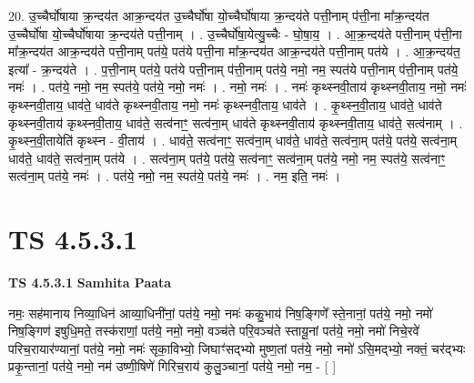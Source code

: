 \documentclass[17pt]{extarticle}
\begin{document}
20. उ॒च्चैर्घो॑षाया क्र॒न्दय॑त आक्र॒न्दय॑त उ॒च्चैर्घो॑षा यो॒च्चैर्घो॑षाया क्र॒न्दय॑ते पत्ती॒नाम् प॑त्ती॒ना मा᳚क्र॒न्दय॑त उ॒च्चैर्घो॑षा यो॒च्चैर्घो॑षाया क्र॒न्दय॑ते पत्ती॒नाम् । . उ॒च्चैर्घो॑षा॒येत्यु॒च्चैः - घो॒षा॒य॒ । . आ॒क्र॒न्दय॑ते पत्ती॒नाम् प॑त्ती॒ना मा᳚क्र॒न्दय॑त आक्र॒न्दय॑ते पत्ती॒नाम् पत॑ये॒ पत॑ये पत्ती॒ना मा᳚क्र॒न्दय॑त आक्र॒न्दय॑ते पत्ती॒नाम् पत॑ये । . आ॒क्र॒न्दय॑त॒ इत्या᳚ - क्र॒न्दय॑ते । . प॒त्ती॒नाम् पत॑ये॒ पत॑ये पत्ती॒नाम् प॑त्ती॒नाम् पत॑ये॒ नमो॒ नम॒ स्पत॑ये पत्ती॒नाम् प॑त्ती॒नाम् पत॑ये॒ नमः॑ । . पत॑ये॒ नमो॒ नम॒ स्पत॑ये॒ पत॑ये॒ नमो॒ नमः॑ । . नमो॒ नमः॑ । . नमः॑ कृथ्स्नवी॒ताय॑ कृथ्स्नवी॒ताय॒ नमो॒ नमः॑ कृथ्स्नवी॒ताय॒ धाव॑ते॒ धाव॑ते कृथ्स्नवी॒ताय॒ नमो॒ नमः॑ कृथ्स्नवी॒ताय॒ धाव॑ते । . कृ॒थ्स्न॒वी॒ताय॒ धाव॑ते॒ धाव॑ते कृथ्स्नवी॒ताय॑ कृथ्स्नवी॒ताय॒ धाव॑ते॒ सत्व॑नाꣳ॒॒ सत्व॑ना॒म् धाव॑ते कृथ्स्नवी॒ताय॑ कृथ्स्नवी॒ताय॒ धाव॑ते॒ सत्व॑नाम् । . कृ॒थ्स्न॒वी॒तायेति॑ कृथ्स्न - वी॒ताय॑ । . धाव॑ते॒ सत्व॑नाꣳ॒॒ सत्व॑ना॒म् धाव॑ते॒ धाव॑ते॒ सत्व॑ना॒म् पत॑ये॒ पत॑ये॒ सत्व॑ना॒म् धाव॑ते॒ धाव॑ते॒ सत्व॑ना॒म् पत॑ये । . सत्व॑ना॒म् पत॑ये॒ पत॑ये॒ सत्व॑नाꣳ॒॒ सत्व॑ना॒म् पत॑ये॒ नमो॒ नम॒ स्पत॑ये॒ सत्व॑नाꣳ॒॒ सत्व॑ना॒म् पत॑ये॒ नमः॑ । . पत॑ये॒ नमो॒ नम॒ स्पत॑ये॒ पत॑ये॒ नमः॑ । . नम॒ इति॒ नमः॑ । \newline
\pagebreak
{}

\section{ TS 4.5.3.1 }

\textbf{TS 4.5.3.1 } \newline
\textbf{Samhita Paata} \newline

नमः॒ सह॑मानाय निव्या॒धिन॑ आव्या॒धिनी॑नां॒ पत॑ये॒ नमो॒          नमः॑ ककु॒भाय॑ निष॒ङ्गिणे᳚ स्ते॒नानां॒ पत॑ये॒ नमो॒                       नमो॑ निष॒ङ्गिण॑ इषुधि॒मते॒ तस्क॑राणां॒ पत॑ये॒ नमो॒           नमो॒ वञ्च॑ते परि॒वञ्च॑ते स्तायू॒नां पत॑ये॒ नमो॒                                         नमो॑ निचे॒रवे॑ परिच॒रायार॑ण्यानां॒ पत॑ये॒ नमो॒                                   नमः॑ सृका॒विभ्यो॒ जिघाꣳ॑सद्भ्यो मुष्ण॒तां पत॑ये॒ नमो॒                   नमो॑ ऽसि॒मद्भ्यो॒ नक्तं॒ चर॑द्भ्यः प्रकृ॒न्तानां॒ पत॑ये॒ नमो॒ नम॑ उष्णी॒षिणे॑ गिरिच॒राय॑ कुलु॒ञ्चानां॒ पत॑ये॒ नमो॒ नम॒ - [  ] \newline
\end{document}
